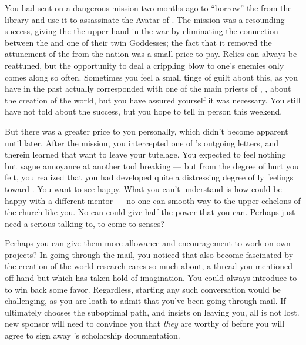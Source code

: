 \documentclass[char]{GL2020}
\begin{document}
You had sent \cScholarship{} on a dangerous mission two months ago to ``borrow'' the \iScythe{} from the \pSc{} library and use it to assassinate the Avatar of \cEbbFull{\intro}. The mission was a resounding success, giving the \pTech{} the upper hand in the war by eliminating the connection between the \pShip{} and one of their twin Goddesses; the fact that it removed the attunement of the \iScythe{} from the \pFarm{} nation was a small price to pay. Relics can always be reattuned, but the opportunity to deal a crippling blow to one's enemies only comes along so often. Sometimes you feel a small tinge of guilt about this, as you have in the past actually corresponded with one of the main priests of \cEbb{\intro}, \cEbbPriest{\intro}, about the creation of the world, but you have assured yourself it was necessary. You still have not told \cEvil{} about the success, but you hope to tell \cEvil{\them} in person this weekend.  

But there was a greater price to you personally, which didn't become apparent until later. After the mission, you intercepted one of \cScholarship{}'s outgoing letters, and therein learned that \cScholarship{\they} want\cScholarship{\verbs} to leave your tutelage. You expected to feel nothing but vague annoyance at another tool breaking — but from the degree of hurt you felt, you realized that you had developed quite a distressing degree of \cAntiChup{\parent}ly feelings toward \cScholarship{\them}. You want to see \cScholarship{} happy. What you can’t understand is how \cScholarship{\they} could be happy with a different mentor — no one can smooth \cScholarship{\their} way to the upper echelons of the church like you. No can could give \cScholarship{\them} half the power that you can. Perhaps \cScholarship{\they} just need\cScholarship{\verbs} a serious talking to, to come to \cScholarship{\their} senses?  

Perhaps you can give them more allowance and encouragement to work on \cScholarship{\their} own projects? In going through the mail, you noticed that \cScholarship{\they} also \cScholarship{\have} become fascinated by the creation of the world research \cEbbPriest{} cares so much about, a thread you mentioned off hand but which has taken hold of \cScholarship{\their} imagination. You could always introduce \cScholarship{\them} to \cEbbPriest{} to win back some favor. Regardless, starting any such conversation would be challenging, as you are loath to admit that you've been going through \cScholarship{\their} mail.  If ultimately \cScholarship{} chooses the suboptimal path, and insists on leaving you, all is not lost. \cScholarship{\Their} new sponsor will need to convince you that \emph{they} are worthy of \cScholarship{} before you will agree to sign away \cScholarship{}'s scholarship documentation.
\end{document}
